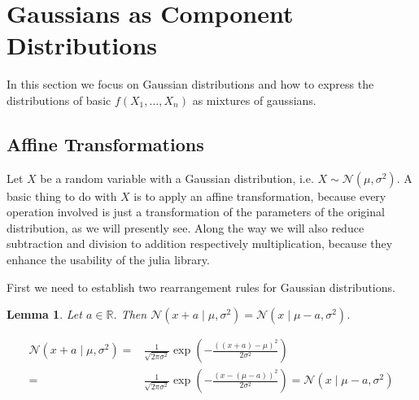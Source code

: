 \documentclass[11pt,a4paper]{book}
\newtheorem{lemma}{Lemma}
\begin{document}
\section{Gaussians as Component Distributions}
\label{sec:gaussians}

In this section we focus on Gaussian distributions and how to express the
distributions of basic $f(X_{1}, \dots, X_{n})$ as mixtures of gaussians.

\subsection{Affine Transformations}
\label{sec:affine-transforms}

Let $X$ be a random variable with a Gaussian distribution, i.e.
$X \sim \mathcal{N}(\mu, \sigma^{2})$. A basic thing to do with $X$ is to apply
an affine transformation, because every operation involved is just a
transformation of the parameters of the original distribution, as we will
presently see. Along the way we will also reduce subtraction and division to
addition respectively multiplication, because they enhance the usability of the
julia library.

First we need to establish two rearrangement rules for Gaussian distributions.
\begin{lemma}
  \label{lemma:x-mu-symmetry}
  Let $a \in \mathbb{R}$. Then
  $\mathcal{N}(x + a \mid \mu, \sigma^{2}) = \mathcal{N}(x \mid \mu - a,
  \sigma^{2})$.
\end{lemma}
\begin{proof2}
  \begin{align*}
    \mathcal{N}(x + a \mid \mu, \sigma^{2}) = & \frac{1}{\sqrt{2 \pi \sigma^{2}}} \exp\left( - \frac{\left((x + a) - \mu \right)^{2}}{2\sigma^{2}} \right)\\
    = & \frac{1}{\sqrt{2 \pi \sigma^{2}}} \exp\left( - \frac{\left(x - (\mu - a) \right)^{2}}{2\sigma^{2}} \right) = \mathcal{N}(x \mid \mu - a, \sigma^{2})
  \end{align*}
\end{proof2}
\end{document}
